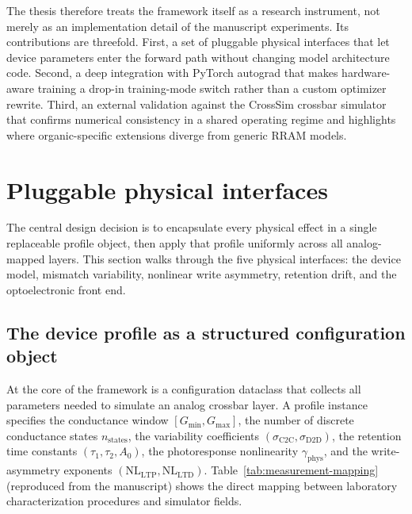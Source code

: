 The thesis therefore treats the framework itself as a research instrument, not merely as an implementation detail of the manuscript experiments. Its contributions are threefold. First, a set of pluggable physical interfaces that let device parameters enter the forward path without changing model architecture code. Second, a deep integration with PyTorch autograd that makes hardware-aware training a drop-in training-mode switch rather than a custom optimizer rewrite. Third, an external validation against the CrossSim crossbar simulator that confirms numerical consistency in a shared operating regime and highlights where organic-specific extensions diverge from generic RRAM models.

\section{Pluggable physical interfaces}
\label{sec:pluggable-interfaces}

The central design decision is to encapsulate every physical effect in a single replaceable profile object, then apply that profile uniformly across all analog-mapped layers. This section walks through the five physical interfaces: the device model, mismatch variability, nonlinear write asymmetry, retention drift, and the optoelectronic front end.

\subsection{The device profile as a structured configuration object}

At the core of the framework is a configuration dataclass that collects all parameters needed to simulate an analog crossbar layer. A profile instance specifies the conductance window $[G_{\min}, G_{\max}]$, the number of discrete conductance states $n_{\text{states}}$, the variability coefficients $(\sigma_{\text{C2C}}, \sigma_{\text{D2D}})$, the retention time constants $(\tau_1, \tau_2, A_0)$, the photoresponse nonlinearity $\gamma_{\text{phys}}$, and the write-asymmetry exponents $(\mathrm{NL}_{\mathrm{LTP}}, \mathrm{NL}_{\mathrm{LTD}})$. Table~\ref{tab:measurement-mapping} (reproduced from the manuscript) shows the direct mapping between laboratory characterization procedures and simulator fields.

